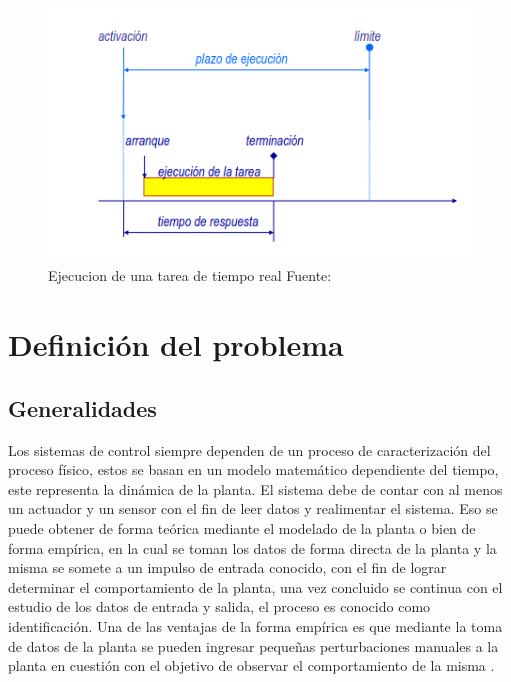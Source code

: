 \documentclass[12pt]{article}
\begin{document}
\begin{figure}[H]
  \centering
  \includegraphics[scale=0.5]{diagramas/tiempo_real.png}
  \caption{Ejecucion de una tarea de tiempo real Fuente: \cite{de2000introduccion}}
  \label{fig:diagrama_tiempo_real}
\end{figure}

\newpage

\section{Definición del problema}

\subsection{Generalidades}

Los sistemas de control siempre dependen de un proceso de caracterización del proceso físico, estos se basan en un modelo matemático dependiente del tiempo, este representa la dinámica de la planta. El sistema debe de contar con al menos un actuador y un sensor con el fin de leer datos y realimentar el sistema. Eso se puede obtener de forma teórica mediante el modelado de la planta o bien de forma empírica, en la cual se toman los datos de forma directa de la planta y la misma se somete a un impulso de entrada conocido, con el fin de lograr determinar el comportamiento de la planta, una vez concluido se continua con el estudio de los datos de entrada y salida, el proceso es conocido como identificación. Una de las ventajas de la forma empírica es que mediante la toma de datos de la planta se pueden ingresar pequeñas perturbaciones manuales a la planta en cuestión con el objetivo de observar el comportamiento de la misma \cite{15-tec}. 
\end{document}
